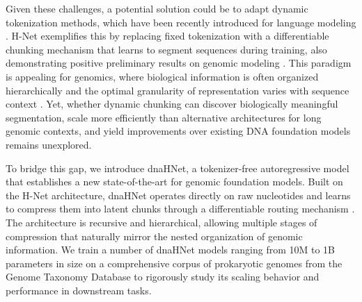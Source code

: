 \documentclass{article}
\theoremstyle{plain}
\theoremstyle{definition}
\theoremstyle{remark}
\begin{document}
Given these challenges, a potential solution could be to adapt dynamic tokenization methods, which have been recently introduced for language modeling \citep{pagnoni2024bytelatenttransformerpatches, hwang2025dynamicchunkingendtoendhierarchical}. H-Net exemplifies this by replacing fixed tokenization with a differentiable chunking mechanism that learns to segment sequences during training, also demonstrating positive preliminary results on genomic modeling \citep{hwang2025dynamicchunkingendtoendhierarchical}. This paradigm is appealing for genomics, where biological information is often organized hierarchically and the optimal granularity of representation varies with sequence context \citep{Libbrecht2015}. Yet, whether dynamic chunking can discover biologically meaningful segmentation, scale more efficiently than alternative architectures for long genomic contexts, and yield improvements over existing DNA foundation models remains unexplored.

To bridge this gap, we introduce dnaHNet, a tokenizer-free autoregressive model that establishes a new state-of-the-art for genomic foundation models. Built on the H-Net architecture, dnaHNet operates directly on raw nucleotides and learns to compress them into latent chunks through a differentiable routing mechanism \citep{hwang2025dynamicchunkingendtoendhierarchical}. The architecture is recursive and hierarchical, allowing multiple stages of compression that naturally mirror the nested organization of genomic information. We train a number of dnaHNet models ranging from 10M to 1B parameters in size on a comprehensive corpus of prokaryotic genomes from the Genome Taxonomy Database to rigorously study its scaling behavior and performance in downstream tasks\citep{Parks2025}.
\end{document}
